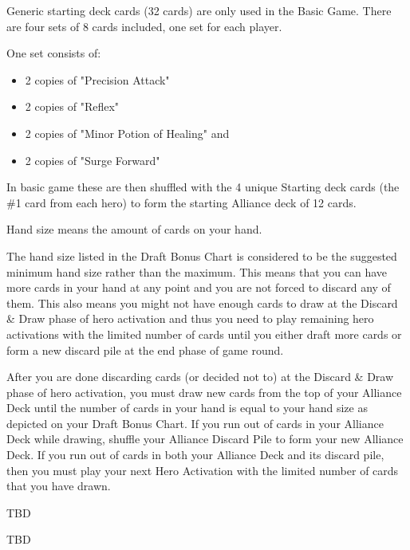 Generic starting deck cards (32 cards) are only used in the Basic Game. There are four sets of 8 cards included, one set for each player.

One set consists of:
\begin{itemize}
  \item 2 copies of "Precision Attack"
  \item 2 copies of "Reflex"
  \item 2 copies of "Minor Potion of Healing" and
  \item 2 copies of "Surge Forward"
\end{itemize}

In basic game these are then shuffled with the 4 unique Starting deck cards (the \#1 card from each hero) to form the starting Alliance deck of 12 cards.



Hand size means the amount of cards on your hand. 

The hand size listed in the Draft Bonus Chart is considered to be the suggested minimum hand size rather than the maximum. This means that you can have more cards in your hand at any point and you are not forced to discard any of them. This also means you might not have enough cards to draw at the Discard \& Draw phase of hero activation and thus you need to play remaining hero activations with the limited number of cards until you either draft more cards or form a new discard pile at the end phase of game round.

After you are done discarding cards (or decided not to) at the Discard \& Draw phase of hero activation, you must draw new cards from the top of your Alliance Deck until the number of cards in your hand is equal to your hand size as depicted on your Draft Bonus Chart. If you run out of cards in your Alliance Deck while drawing, shuffle your Alliance Discard Pile to form your new Alliance Deck. If you run out of cards in both your Alliance Deck and its discard pile, then you must play your next Hero Activation with the limited number of cards that you have drawn.




TBD

TBD

